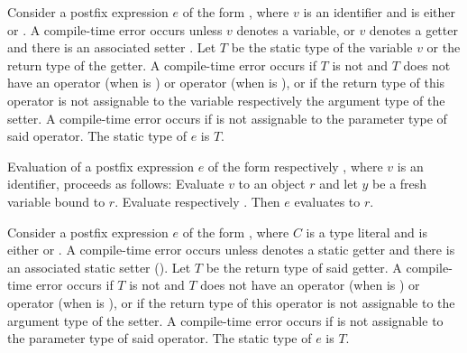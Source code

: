 \documentclass[makeidx]{article}
\begin{document}
{%
\EndCase

\LMHash{}%
Consider a postfix expression $e$ of the form ,
where $v$ is an identifier and \op{} is either \lit{++} or \lit{-{}-}.
A compile-time error occurs unless $v$ denotes a variable,
or $v$ denotes a getter and there is an associated setter .
Let $T$ be the static type of the variable $v$ or the return type of the getter.
A compile-time error occurs if $T$ is not \DYNAMIC{}
and $T$ does not have an operator \lit{+} (when \op{} is \lit{++})
or operator \lit{-} (when \op{} is \lit{-{}-}),
or if the return type of this operator is not assignable to
the variable respectively the argument type of the setter.
A compile-time error occurs if  is not assignable to
the parameter type of said operator.
The static type of $e$ is $T$.

\LMHash{}%
Evaluation of a postfix expression $e$
of the form  respectively ,
where $v$ is an identifier, proceeds as follows:
Evaluate $v$ to an object $r$ and let $y$ be a fresh variable bound to $r$.
Evaluate  respectively .
Then $e$ evaluates to $r$.

\EndCase

\LMHash{}%
Consider a postfix expression $e$ of the form ,
where $C$ is a type literal and \op{} is either \lit{++} or \lit{-{}-}.
A compile-time error occurs unless  denotes a static getter
and there is an associated static setter 
().
Let $T$ be the return type of said getter.
A compile-time error occurs if $T$ is not \DYNAMIC{}
and $T$ does not have an operator \lit{+} (when \op{} is \lit{++})
or operator \lit{-} (when \op{} is \lit{-{}-}),
or if the return type of this operator is not assignable to
the argument type of the setter.
A compile-time error occurs if  is not assignable to
the parameter type of said operator.
The static type of $e$ is $T$.

}
\end{document}

